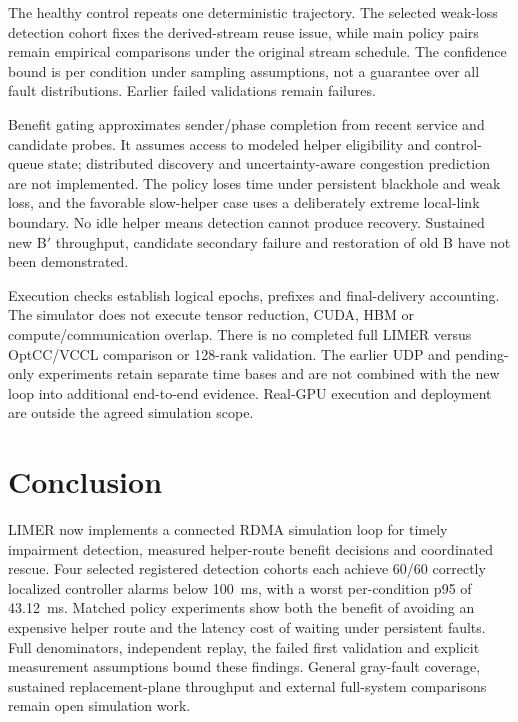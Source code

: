 \documentclass[sigconf]{acmart}
\begin{document}
The healthy control repeats one deterministic trajectory. The selected
weak-loss detection cohort fixes the derived-stream reuse issue, while
main policy pairs remain empirical comparisons under the original stream
schedule. The confidence bound is per condition under sampling assumptions,
not a guarantee over all fault distributions. Earlier failed validations
remain failures.

Benefit gating approximates sender/phase completion from recent service and
candidate probes. It assumes access to modeled helper eligibility and
control-queue state; distributed discovery and uncertainty-aware congestion
prediction are not implemented. The policy loses time under persistent
blackhole and weak loss, and the favorable slow-helper case uses a deliberately
extreme local-link boundary. No idle helper means detection cannot produce
recovery. Sustained new B$'$ throughput, candidate secondary failure and
restoration of old B have not been demonstrated.

Execution checks establish logical epochs, prefixes and final-delivery
accounting. The simulator does not execute tensor reduction, CUDA, HBM or
compute/communication overlap. There is no completed full LIMER versus
OptCC/VCCL comparison or 128-rank validation. The earlier UDP and pending-only
experiments retain separate time bases and are not combined with the new
loop into additional end-to-end evidence. Real-GPU execution and deployment
are outside the agreed simulation scope.

\section{Conclusion}
LIMER now implements a connected RDMA simulation loop for timely impairment
detection, measured helper-route benefit decisions and coordinated rescue.
Four selected registered detection cohorts each achieve 60/60 correctly
localized controller alarms below 100~ms, with a worst per-condition p95 of
43.12~ms. Matched policy experiments show both the benefit of avoiding an
expensive helper route and the latency cost of waiting under persistent
faults. Full denominators, independent replay, the failed first validation
and explicit measurement assumptions bound these findings. General gray-fault
coverage, sustained replacement-plane throughput and external full-system
comparisons remain open simulation work.



\appendix
\end{document}

